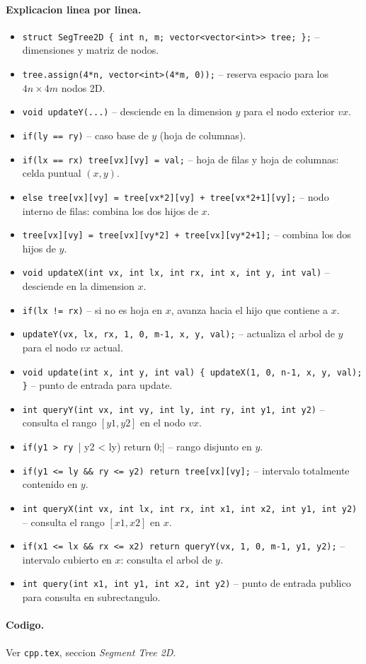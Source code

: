 \paragraph{Explicacion linea por linea.}
\begin{itemize}\setlength\itemsep{0pt}
	\item \verb|struct SegTree2D { int n, m; vector<vector<int>> tree; };| -- dimensiones y matriz de nodos.
	\item \verb|tree.assign(4*n, vector<int>(4*m, 0));| -- reserva espacio para los $4n \times 4m$ nodos 2D.
	\item \verb|void updateY(...)| -- desciende en la dimension $y$ para el nodo exterior $vx$.
	\item \verb|if(ly == ry)| -- caso base de $y$ (hoja de columnas).
	\item \verb|if(lx == rx) tree[vx][vy] = val;| -- hoja de filas y hoja de columnas: celda puntual $(x, y)$.
	\item \verb|else tree[vx][vy] = tree[vx*2][vy] + tree[vx*2+1][vy];| -- nodo interno de filas: combina los dos hijos de $x$.
	\item \verb|tree[vx][vy] = tree[vx][vy*2] + tree[vx][vy*2+1];| -- combina los dos hijos de $y$.
	\item \verb|void updateX(int vx, int lx, int rx, int x, int y, int val)| -- desciende en la dimension $x$.
	\item \verb|if(lx != rx)| -- si no es hoja en $x$, avanza hacia el hijo que contiene a $x$.
	\item \verb|updateY(vx, lx, rx, 1, 0, m-1, x, y, val);| -- actualiza el arbol de $y$ para el nodo $vx$ actual.
	\item \verb|void update(int x, int y, int val) { updateX(1, 0, n-1, x, y, val); }| -- punto de entrada para update.
	\item \verb|int queryY(int vx, int vy, int ly, int ry, int y1, int y2)| -- consulta el rango $[y1, y2]$ en el nodo $vx$.
	\item \verb|if(y1 > ry || y2 < ly) return 0;| -- rango disjunto en $y$.
	\item \verb|if(y1 <= ly && ry <= y2) return tree[vx][vy];| -- intervalo totalmente contenido en $y$.
	\item \verb|int queryX(int vx, int lx, int rx, int x1, int x2, int y1, int y2)| -- consulta el rango $[x1, x2]$ en $x$.
	\item \verb|if(x1 <= lx && rx <= x2) return queryY(vx, 1, 0, m-1, y1, y2);| -- intervalo cubierto en $x$: consulta el arbol de $y$.
	\item \verb|int query(int x1, int y1, int x2, int y2)| -- punto de entrada publico para consulta en subrectangulo.
\end{itemize}

\paragraph{Codigo.}
Ver \texttt{cpp.tex}, seccion \textit{Segment Tree 2D}.

\vspace{0.5em}
